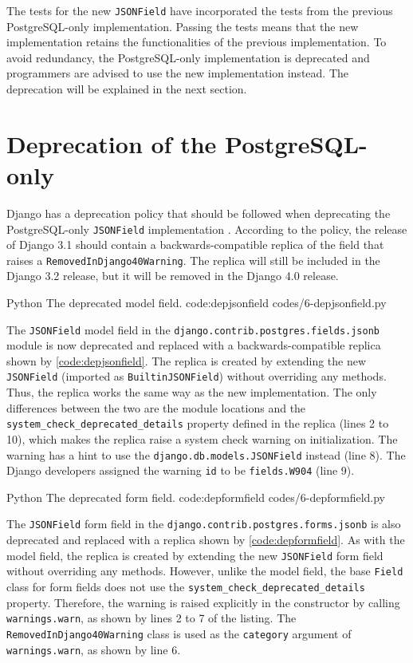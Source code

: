 The tests for the new \verb|JSONField| have incorporated the tests from the
previous PostgreSQL-only implementation. Passing the tests means that the new
implementation retains the functionalities of the previous implementation.
To avoid redundancy, the PostgreSQL-only implementation is deprecated and
programmers are advised to use the new implementation instead. The deprecation
will be explained in the next section.

\section{Deprecation of the PostgreSQL-only }

Django has a deprecation policy that should be followed when deprecating the
PostgreSQL-only \verb|JSONField| implementation \cite{django:deprecation-policy}.
According to the policy, the release of Django 3.1 should contain a
backwards-compatible replica of the field that raises a
\verb|RemovedInDjango40Warning|. The replica will still be included in the
Django 3.2 release, but it will be removed in the Django 4.0 release.

\listing
{Python}
{The deprecated  model field.}
{code:depjsonfield}
{codes/6-depjsonfield.py}

The \verb|JSONField| model field in the
\verb|django.contrib.postgres.fields.jsonb| module is now deprecated and
replaced with a backwards-compatible replica shown by
\autoref{code:depjsonfield}. The replica is created by extending the new
\verb|JSONField| (imported as \verb|BuiltinJSONField|) without overriding any
methods. Thus, the replica works the same way as the new implementation. The
only differences between the two are the module locations and the
\verb|system_check_deprecated_details| property defined in the replica (lines 2
to 10), which makes the replica raise a system check warning on initialization.
The warning has a hint to use the \verb|django.db.models.JSONField| instead
(line 8). The Django developers assigned the warning \verb|id| to be
\verb|fields.W904| (line 9).

\listing
{Python}
{The deprecated  form field.}
{code:depformfield}
{codes/6-depformfield.py}

The \verb|JSONField| form field in the
\verb|django.contrib.postgres.forms.jsonb| is also deprecated and replaced with
a replica shown by \autoref{code:depformfield}. As with the model field, the
replica is created by extending the new \verb|JSONField| form field without
overriding any methods. However, unlike the model field, the base \verb|Field|
class for form fields does not use the \verb|system_check_deprecated_details|
property. Therefore, the warning is raised explicitly in the constructor by
calling \verb|warnings.warn|, as shown by lines 2 to 7 of the listing. The
\verb|RemovedInDjango40Warning| class is used as the \verb|category| argument
of \verb|warnings.warn|, as shown by line 6.


